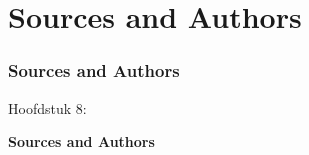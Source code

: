 %

\section{Sources and Authors}
\begin{frame}[fragile]
	\frametitle{Sources and Authors}

	\begin{center}\huge{Hoofdstuk 8:}\end{center}
	\begin{center}\huge{\color{typo3darkgrey}\textbf{Sources and Authors}}\end{center}

\end{frame}

